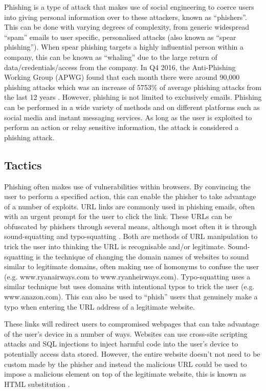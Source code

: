 \documentclass{l4proj}
\begin{document}
Phishing is a type of attack that makes use of social engineering to coerce users into giving personal information over to these attackers, known as “phishers”. This can be done with varying degrees of complexity, from generic widespread “spam” emails to user specific, personalised attacks (also known as “spear phishing”). When spear phishing targets a highly influential person within a company, this can be known as “whaling” due to the large return of data/credentials/access from the company. In Q4 2016, the Anti-Phishing Working Group (APWG) found that each month there were around 90,000 phishing attacks which was an increase of 5753\% of average phishing attacks from the last 12 years \citep{apwg2017phishing}. However, phishing is not limited to exclusively emails. Phishing can be performed in a wide variety of methods and on different platforms such as social media and instant messaging services. As long as the user is exploited to perform an action or relay sensitive information, the attack is considered a phishing attack.

\subsection{Tactics}
\label{sec:other_tactics}

Phishing often makes use of vulnerabilities within browsers. By convincing the user to perform a specified action, this can enable the phisher to take advantage of a number of exploits. URL links are commonly used in phishing emails, often with an urgent prompt for the user to click the link. These URLs can be obfuscated by phishers through several means, although most often it is through sound-squatting and typo-squatting \citep{chiew2018survey}. Both are methods of URL manipulation to trick the user into thinking the URL is recognisable and/or legitimate. Sound-squatting is the technique of changing the domain names of websites to sound similar to legitimate domains, often making use of homonyms to confuse the user (e.g. www.ryanairways.com to www.ryanheirways.com). Typo-squatting uses a similar technique but uses domains with intentional typos to trick the user (e.g. www.anazon.com). This can also be used to “phish” users that genuinely make a typo when entering the URL address of a legitimate website.

These links will redirect users to compromised webpages that can take advantage of the user’s device in a number of ways. Websites can use cross-site scripting attacks and SQL injections to inject harmful code into the user’s device to potentially access data stored. However, the entire website doesn’t not need to be custom made by the phisher and instead the malicious URL could be used to impose a malicious element on top of the legitimate website, this is known as HTML substitution \citep{chiew2018survey}.
\end{document}
